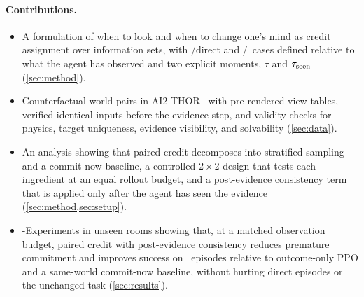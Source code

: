 \paragraph{Contributions.}
\begin{itemize}
\item A formulation of when to look and when to change one's mind as credit assignment over information sets, with \Look/direct and \Flip/\Stay\ cases defined relative to what the agent has observed and two explicit moments, $\tau$ and $\tau_{\mathrm{seen}}$ (\cref{sec:method}).
\item Counterfactual world pairs in AI2-THOR~\cite{ai2thor2017} with pre-rendered view tables, verified identical inputs before the evidence step, and validity checks for physics, target uniqueness, evidence visibility, and solvability (\cref{sec:data}).
\item An analysis showing that paired credit decomposes into stratified sampling and a commit-now baseline, a controlled $2{\times}2$ design that tests each ingredient at an equal rollout budget, and a post-evidence consistency term that is applied only after the agent has seen the evidence (\cref{sec:method,sec:setup}).
\item \hyp{Experiments in unseen rooms showing that, at a matched observation budget, paired credit with post-evidence consistency reduces premature commitment and improves success on \Look\ episodes relative to outcome-only PPO and a same-world commit-now baseline, without hurting direct episodes or the unchanged task (\cref{sec:results}).} %
\end{itemize}
